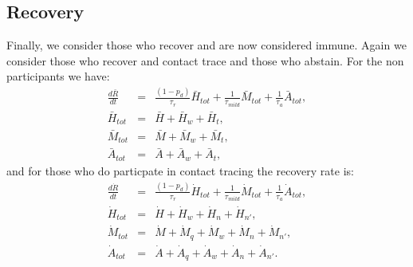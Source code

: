 \documentclass{article}
\begin{document}
\subsection{Recovery}
Finally, we consider those who recover and are now considered immune. Again we consider those who recover and contact trace and those who abstain. For the non participants we have:
\begin{eqnarray}
\frac{d\bar{R}}{dt} &=& \frac{(1 - p_{d})}{\tau_{r}} \bar{H}_{tot} + \frac{1}{\tau_{mild}} \bar{M}_{tot} + \frac{1}{\tau_{a}} \bar{A}_{tot}, \\
\bar{H}_{tot} &=&  \bar{H} + \bar{H}_{w} + \bar{H}_{t} , \\
\bar{M}_{tot} &=&  \bar{M} + \bar{M}_{w} + \bar{M}_{t}, \\
\bar{A}_{tot} &=&  \bar{A} + \bar{A}_{w} + \bar{A}_{t},  
\end{eqnarray}
and for those who do particpate in contact tracing the recovery rate is:
\begin{eqnarray}
\frac{d\dot{R}}{dt} &=& \frac{(1 - p_{d})}{\tau_{r}} \dot{H}_{tot} + \frac{1}{\tau_{mild}} \dot{M}_{tot} + \frac{1}{\tau_{a}} \dot{A}_{tot}, \\
\dot{H}_{tot} &=&  \dot{H} + \dot{H}_{w} + \dot{H}_{n} + \dot{H}_{n'} , \\
\dot{M}_{tot} &=&  \dot{M} + \dot{M}_{q} + \dot{M}_{w} + \dot{M}_{n} + \dot{M}_{n'}, \\
\dot{A}_{tot} &=&  \dot{A} + \dot{A}_{q} + \dot{A}_{w} + \dot{A}_{n} + \dot{A}_{n'}. 
\end{eqnarray}
\end{document}

